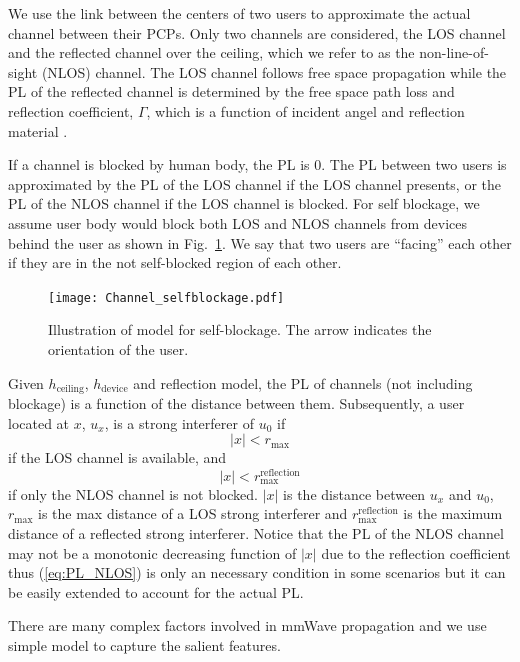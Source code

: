 \documentclass[10pt, conference, letterpaper]{IEEEtran}
\begin{document}
We use the link between the centers of two users to approximate the actual channel between their PCPs. 
Only two channels are considered, the LOS channel and the reflected channel over the ceiling, which we refer to as the non-line-of-sight (NLOS) channel.
The LOS channel follows free space propagation while the PL of the reflected channel is determined by the free space path loss and reflection coefficient, $\Gamma$, which is a function of incident angel and reflection material \cite{reflection}.


If a channel is blocked by human body, the PL is 0.
The PL between two users is approximated by the PL of the LOS channel if the LOS channel presents, or the PL of the NLOS channel if the LOS channel is blocked.
For self blockage, we assume user body would block both LOS and NLOS channels from devices behind the user as shown in Fig.~\ref{fig:channel:self-blockage}. 
We say that two users are ``facing'' each other if they are in the not self-blocked region of each other.


\begin{figure}
	\centering
	\texttt{[image: Channel\_selfblockage.pdf]}
	\caption{Illustration of model for self-blockage. The arrow indicates the orientation of the user.}
	\label{fig:channel:self-blockage}
\end{figure}

Given $h_{\mathrm{ceiling}}$, $h_{\mathrm{device}}$ and reflection model, the PL of channels (not including blockage) is a function of the distance between them.
Subsequently, a user located at $x$, $u_x$, is a strong interferer of $u_0$ if  
\begin{equation}\label{eq:PL_LOS}
|x| < r_{\max}
\end{equation}
if the LOS channel is available, and 
\begin{equation}\label{eq:PL_NLOS}
|x| < r_{\max}^{\mathrm{reflection}}
\end{equation}
if only the NLOS channel is not blocked.
$|x|$ is the distance between $u_x$ and $u_0$, $r_{\max}$ is the max distance of a LOS strong interferer and $r_{\max}^{\mathrm{reflection}}$ is the maximum distance of a reflected strong interferer. Notice that the PL of the NLOS channel may not be a monotonic decreasing function of $|x|$ due to the reflection coefficient thus (\ref{eq:PL_NLOS}) is only an necessary condition in some scenarios but it can be easily extended to account for the actual PL.

There are many complex factors involved in mmWave propagation and we use simple model to capture the salient features.
\end{document}
